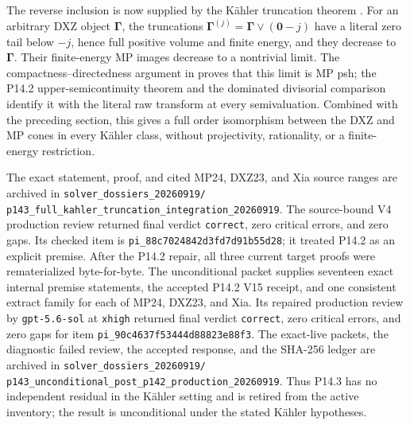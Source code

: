 The reverse inclusion is now supplied by the K\"ahler truncation theorem
.  For an arbitrary DXZ object
\(\boldsymbol\Gamma\), the truncations
\(\boldsymbol\Gamma^{(j)}=\boldsymbol\Gamma\vee(\mathbf0-j)\) have a literal
zero tail below \(-j\), hence full positive volume and finite energy, and they
decrease to \(\boldsymbol\Gamma\).  Their finite-energy MP images decrease to
a nontrivial limit.  The compactness--directedness argument in
 proves that this limit is MP psh;
the P14.2 upper-semicontinuity theorem and the dominated divisorial comparison
identify it with the literal raw transform at every
semivaluation.  Combined with the preceding section, this gives a full order
isomorphism between the DXZ and MP cones in every K\"ahler class, without
projectivity, rationality, or a finite-energy restriction.

The exact statement, proof, and cited MP24, DXZ23, and Xia source ranges are
archived in
\nolinkurl{solver_dossiers_20260919/}
\nolinkurl{p143_full_kahler_truncation_integration_20260919}.
The source-bound V4 production review returned final verdict
\texttt{correct}, zero critical errors, and zero gaps.
Its checked item is \nolinkurl{pi_88c7024842d3fd7d91b55d28}; it treated
P14.2 as an explicit premise.  After the P14.2 repair, all three current target proofs were
rematerialized byte-for-byte.  The unconditional packet supplies seventeen
exact internal premise statements, the accepted P14.2 V15 receipt, and one
consistent extract family for each of MP24, DXZ23, and Xia.  Its repaired
production review by \texttt{gpt-5.6-sol} at \texttt{xhigh} returned final
verdict \texttt{correct}, zero critical errors, and zero gaps for item
\nolinkurl{pi_90c4637f53444d88823e88f3}.  The exact-live packets, the diagnostic
failed review, the accepted response, and the SHA-256 ledger are archived in
\nolinkurl{solver_dossiers_20260919/}
\nolinkurl{p143_unconditional_post_p142_production_20260919}.
Thus P14.3 has no independent residual in the K\"ahler setting and is retired
from the active inventory; the result is unconditional under the stated
K\"ahler hypotheses.

